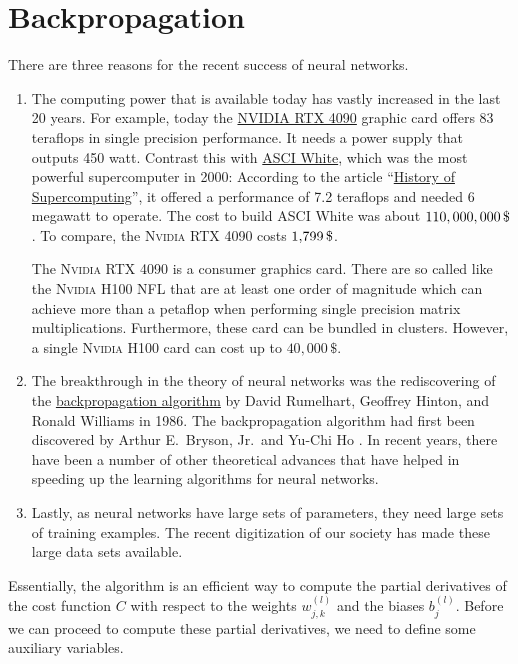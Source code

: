 \section{Backpropagation}
There are three reasons for the recent success of neural networks.
\begin{enumerate}
\item The computing power that is available today has vastly increased in the last 20 years.
      For example, today the
      \href{https://www.nvidia.com/de-de/geforce/graphics-cards/40-series/rtx-4090/}{NVIDIA RTX 4090}
      graphic card offers 83 teraflops in single precision performance. It needs a power supply that
      outputs 450 watt. Contrast this with \href{https://en.wikipedia.org/wiki/ASCI_White}{ASCI White}, which
      was the most powerful supercomputer in 2000: According to the article
      ``\href{https://en.wikipedia.org/wiki/History_of_supercomputing}{History of Supercomputing}'', 
      it  offered a performance of 7.2 teraflops and needed 6 megawatt to operate.  The cost to build ASCI
      White was about $110,000,000\,\symbol{36}$.   To compare, the \textsc{Nvidia} RTX 4090 costs $1,\!799\,\symbol{36}$.

      The \textsc{Nvidia} RTX 4090 is a consumer graphics card.  There are so called 
      like the \textsc{Nvidia} H100 NFL that are at least one order of magnitude which can achieve more than a
      petaflop when performing single precision matrix multiplications.  Furthermore, these card can be bundled
      in clusters.  However, a single \textsc{Nvidia} H100 card can cost up to $40,000\, \$$.
\item The breakthrough in the theory of neural networks was the rediscovering of the
      \href{https://en.wikipedia.org/wiki/Backpropagation}{backpropagation algorithm}  by
      David Rumelhart, Geoffrey Hinton, and Ronald Williams \cite{rumelhart:1986} in 1986.  
      The backpropagation algorithm had first been discovered by Arthur E.~Bryson, Jr.~and Yu-Chi Ho
      \cite{bryson:1969}.  In recent years, there have been a number of other theoretical advances that have
      helped in speeding up the learning algorithms for neural networks.
\item Lastly, as neural networks have large sets of parameters, they need large sets of training examples.  The
      recent digitization of our society has made these large data sets available.
\end{enumerate}
Essentially, the  algorithm is an efficient way to compute the partial derivatives of the
cost function $C$ with respect to the weights $w_{j,k}^{(l)}$ and the biases $b_j^{(l)}$.  Before we can
proceed to compute these partial derivatives, we need to define some auxiliary variables. 

